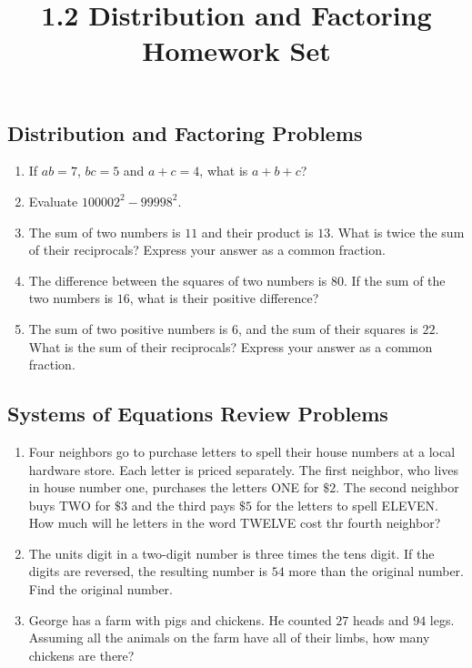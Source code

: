 \documentclass{article}
\title{1.2 Distribution and Factoring Homework Set}
\author{}
\date{}
\begin{document}
\maketitle

\subsection*{Distribution and Factoring Problems}
\begin{enumerate}
    \item If $ab = 7$, $bc = 5$ and $a + c = 4$, what is $a + b + c$?
    \vspace{3cm}
    \item Evaluate $100002^2 - 99998^2$.
    \vspace{3cm}
    \item The sum of two numbers is $11$ and their product is $13$. What
    is twice the sum of their reciprocals? Express your answer as a
    common fraction.
    \vspace{3cm}
    \item The difference between the squares of two numbers is $80$. If the
    sum of the two numbers is $16$, what is their positive difference?
    \vspace{3cm}
    \item The sum of two positive numbers is $6$, and the sum of their
    squares is $22$. What is the sum of their reciprocals? Express your
    answer as a common fraction.
\end{enumerate}

\newpage

\subsection*{Systems of Equations Review Problems}
\begin{enumerate}[resume]
    \item Four neighbors go to purchase letters to spell their house numbers
    at a local hardware store. Each letter is priced separately. The first
    neighbor, who lives in house number one, purchases the letters ONE for
    $\$2$. The second neighbor buys TWO for $\$3$ and the third pays $\$5$
    for the letters to spell ELEVEN. How much will he letters in the word
    TWELVE cost thr fourth neighbor?
    \vspace{3cm}
    \item The units digit in a two-digit number is three times the tens
    digit. If the digits are reversed, the resulting number is $54$ more
    than the original number. Find the original number.
    \vspace{3cm}
    \item George has a farm with pigs and chickens. He counted $27$ heads
    and $94$ legs. Assuming all the animals on the farm have all of their
    limbs, how many chickens are there?
    \vspace{3cm}
\end{enumerate}
\end{document}
